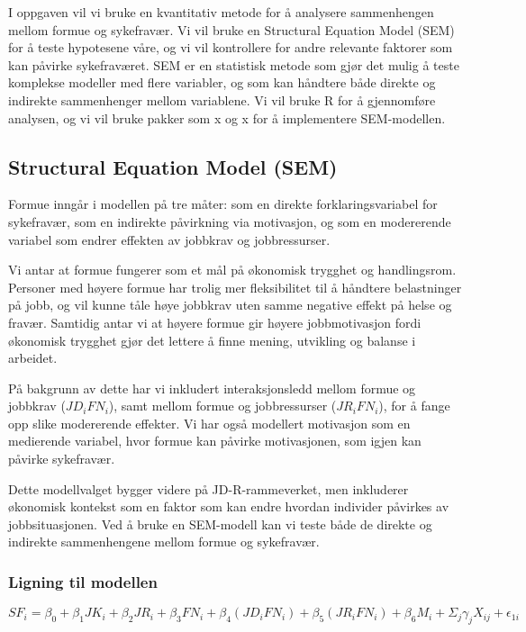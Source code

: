 \documentclass[
  12pt,
  a4paper,
  DIV=11,
  numbers=noendperiod]{scrartcl}
\begin{document}
I oppgaven vil vi bruke en kvantitativ metode for å analysere
sammenhengen mellom formue og sykefravær. Vi vil bruke en Structural
Equation Model (SEM) for å teste hypotesene våre, og vi vil kontrollere
for andre relevante faktorer som kan påvirke sykefraværet. SEM er en
statistisk metode som gjør det mulig å teste komplekse modeller med
flere variabler, og som kan håndtere både direkte og indirekte
sammenhenger mellom variablene. Vi vil bruke R for å gjennomføre
analysen, og vi vil bruke pakker som x og x for å implementere
SEM-modellen.

\subsection{Structural Equation Model
(SEM)}\label{structural-equation-model-sem}

Formue inngår i modellen på tre måter: som en direkte
forklaringsvariabel for sykefravær, som en indirekte påvirkning via
motivasjon, og som en modererende variabel som endrer effekten av
jobbkrav og jobbressurser.

Vi antar at formue fungerer som et mål på økonomisk trygghet og
handlingsrom. Personer med høyere formue har trolig mer fleksibilitet
til å håndtere belastninger på jobb, og vil kunne tåle høye jobbkrav
uten samme negative effekt på helse og fravær. Samtidig antar vi at
høyere formue gir høyere jobbmotivasjon fordi økonomisk trygghet gjør
det lettere å finne mening, utvikling og balanse i arbeidet.

På bakgrunn av dette har vi inkludert interaksjonsledd mellom formue og
jobbkrav (\(JD_i FN_i\)), samt mellom formue og jobbressurser
(\(JR_i FN_i\)), for å fange opp slike modererende effekter. Vi har også
modellert motivasjon som en medierende variabel, hvor formue kan påvirke
motivasjonen, som igjen kan påvirke sykefravær.

Dette modellvalget bygger videre på JD-R-rammeverket, men inkluderer
økonomisk kontekst som en faktor som kan endre hvordan individer
påvirkes av jobbsituasjonen. Ved å bruke en SEM-modell kan vi teste både
de direkte og indirekte sammenhengene mellom formue og sykefravær.

\subsubsection{Ligning til modellen}\label{ligning-til-modellen}

\[
SF_i = \beta_0 + \beta_1 JK_i + \beta_2 JR_i + \beta_3 FN_i + \beta_4 (JD_iFN_i) + \beta_5 (JR_i FN_i) + \beta_6 M_i + \Sigma_j \gamma_{j}X_{ij} + \epsilon_{1i}
\]
\end{document}
